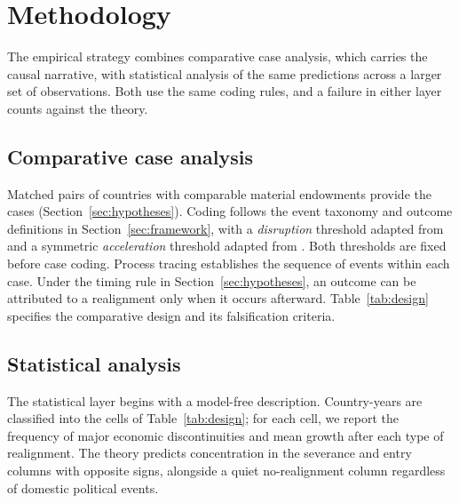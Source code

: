 \documentclass[11pt]{article}
\begin{document}
\section{Methodology}
\label{sec:methodology}

The empirical strategy combines comparative case analysis, which carries the causal narrative, with statistical analysis of the same predictions across a larger set of observations. Both use the same coding rules, and a failure in either layer counts against the theory.

\subsection{Comparative case analysis}

Matched pairs of countries with comparable material endowments provide the cases (Section~\ref{sec:hypotheses}). Coding follows the event taxonomy and outcome definitions in Section~\ref{sec:framework}, with a \emph{disruption} threshold adapted from \textcite{rodrik_1999} and a symmetric \emph{acceleration} threshold adapted from \textcite{hausmann_pritchett_rodrik_2005}. Both thresholds are fixed before case coding. Process tracing establishes the sequence of events within each case. Under the timing rule in Section~\ref{sec:hypotheses}, an outcome can be attributed to a realignment only when it occurs afterward. Table~\ref{tab:design} specifies the comparative design and its falsification criteria.

\subsection{Statistical analysis}

The statistical layer begins with a model-free description. Country-years are classified into the cells of Table~\ref{tab:design}; for each cell, we report the frequency of major economic discontinuities and mean growth after each type of realignment. The theory predicts concentration in the severance and entry columns with opposite signs, alongside a quiet no-realignment column regardless of domestic political events.
\end{document}
